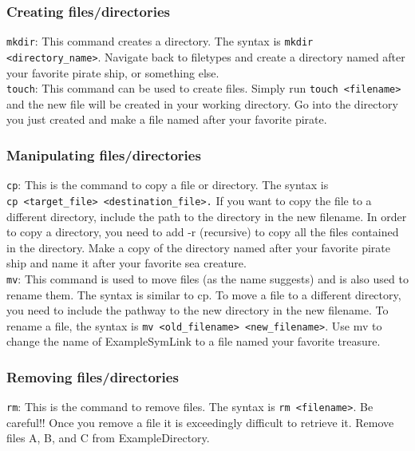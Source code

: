 \documentclass[11pt,a4paper]{article}
\begin{document}
\subsubsection*{Creating files/directories}

\indent\indent \verb|mkdir|: This command creates a directory. The syntax is \verb|mkdir <directory_name>|. Navigate back to filetypes and create a directory named after your favorite pirate ship, or something else. \\

\verb|touch|: This command can be used to create files. Simply run \verb|touch <filename>| and the new file will be created in your working directory. Go into the directory you just created and make a file named after your favorite pirate.

\subsubsection*{Manipulating files/directories}

\indent\indent \verb|cp|: This is the command to copy a file or directory. The syntax is \\
\verb|cp <target_file> <destination_file>.|
If you want to copy the file to a different directory, include the path to the directory in the new filename. In order to copy a directory, you need to add -r (recursive) to copy all the files contained in the directory. Make a copy of the directory named after your favorite pirate ship and name it after your favorite sea creature. \\

\verb|mv|: This command is used to move files (as the name suggests) and is also used to rename them. The syntax is similar to cp. To move a file to a different directory, you need to include the pathway to the new directory in the new filename. To rename a file, the syntax is \verb|mv <old_filename> <new_filename>|. Use mv to change the name of ExampleSymLink to a file named your favorite treasure.

\subsubsection*{Removing files/directories}

\indent\indent \verb|rm|: This is the command to remove files. The syntax is \verb|rm <filename>|. Be careful!! Once you remove a file it is exceedingly difficult to retrieve it. Remove files A, B, and C from ExampleDirectory. \\
\end{document}
